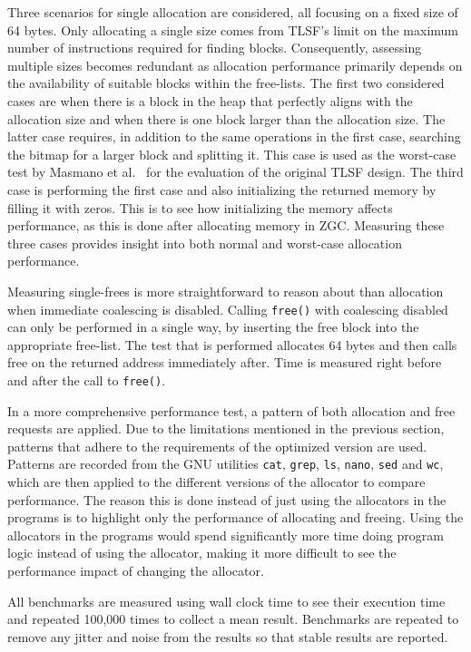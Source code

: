 Three scenarios for single allocation are considered, all focusing on a fixed size of 64 bytes. Only allocating a single size comes from TLSF's limit on the maximum number of instructions required for finding blocks. Consequently, assessing multiple sizes becomes redundant as allocation performance primarily depends on the availability of suitable blocks within the free-lists. The first two considered cases are when there is a block in the heap that perfectly aligns with the allocation size and when there is one block larger than the allocation size. The latter case requires, in addition to the same operations in the first case, searching the bitmap for a larger block and splitting it. This case is used as the worst-case test by Masmano et al.~\cite{TLSF} for the evaluation of the original TLSF design. The third case is performing the first case and also initializing the returned memory by filling it with zeros. This is to see how initializing the memory affects performance, as this is done after allocating memory in ZGC. Measuring these three cases provides insight into both normal and worst-case allocation performance.

Measuring single-frees is more straightforward to reason about than allocation when immediate coalescing is disabled. Calling \texttt{free()} with coalescing disabled can only be performed in a single way, by inserting the free block into the appropriate free-list. The test that is performed allocates 64 bytes and then calls free on the returned address immediately after. Time is measured right before and after the call to \texttt{free()}.

In a more comprehensive performance test, a pattern of both allocation and free requests are applied. Due to the limitations mentioned in the previous section, patterns that adhere to the requirements of the optimized version are used. Patterns are recorded from the GNU utilities  \texttt{cat}, \texttt{grep}, \texttt{ls}, \texttt{nano}, \texttt{sed} and \texttt{wc}, which are then applied to the different versions of the allocator to compare performance. The reason this is done instead of just using the allocators in the programs is to highlight only the performance of allocating and freeing. Using the allocators in the programs would spend significantly more time doing program logic instead of using the allocator, making it more difficult to see the performance impact of changing the allocator.

All benchmarks are measured using wall clock time to see their execution time and repeated 100,000 times to collect a mean result. Benchmarks are repeated to remove any jitter and noise from the results so that stable results are reported.

